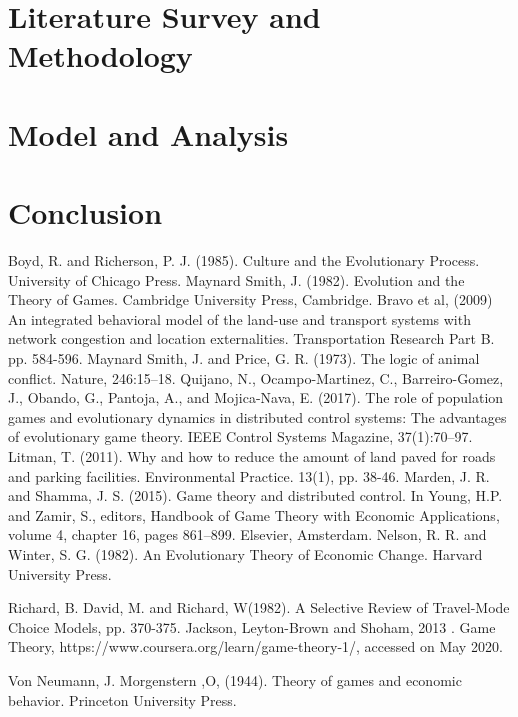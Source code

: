 \documentclass[12pt]{report}
\begin{document}
\chapter{Literature Survey and Methodology} 


\chapter{Model and Analysis}


\chapter*{Conclusion}


\begin{thebibliography}{2}
Boyd, R. and Richerson, P. J. (1985). Culture and the Evolutionary Process. University of Chicago Press.
Maynard Smith, J. (1982). Evolution and the Theory of Games. Cambridge University Press, Cambridge.
Bravo et al, (2009) An integrated behavioral model of the land-use and transport systems with network congestion and location externalities. Transportation Research Part B. pp. 584-596.
Maynard Smith, J. and Price, G. R. (1973). The logic of animal conflict. Nature, 246:15–18. 
Quijano, N., Ocampo-Martinez, C., Barreiro-Gomez, J., Obando, G., Pantoja, A., and Mojica-Nava, E. (2017). The role of population games and evolutionary dynamics in distributed control systems: The advantages of evolutionary game theory. IEEE Control Systems Magazine, 37(1):70–97.
Litman, T. (2011). Why and how to reduce the amount of land paved for roads
and parking facilities. Environmental Practice. 13(1), pp. 38-46.
Marden, J. R. and Shamma, J. S. (2015). Game theory and distributed control. In Young, H.P. and Zamir, S., editors, Handbook of Game Theory with Economic Applications, volume 4, chapter 16, pages 861–899. Elsevier, Amsterdam.
Nelson, R. R. and Winter, S. G. (1982). An Evolutionary Theory of Economic Change. Harvard University Press.

Richard, B. David, M. and Richard, W(1982). A Selective Review of Travel-Mode Choice Models, pp. 370-375.
Jackson, Leyton-Brown and Shoham, 2013 . Game Theory, https://www.coursera.org/learn/game-theory-1/, accessed on May 2020. 

Von Neumann, J. Morgenstern ,O, (1944). Theory of games and economic behavior. Princeton University Press.
\end{thebibliography}
\end{document}

